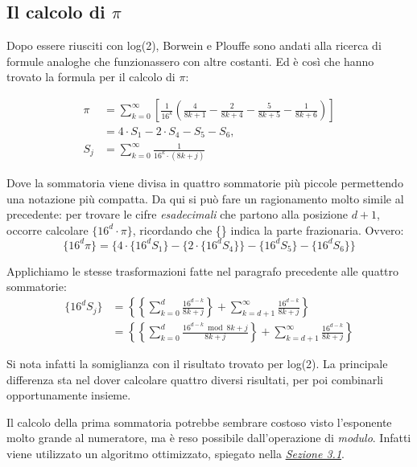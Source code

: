 \subsection{Il calcolo di $\pi$}
Dopo essere riusciti con log(2), Borwein e Plouffe sono andati alla ricerca di formule analoghe che funzionassero con altre costanti. Ed è così che hanno trovato la formula per il calcolo di $\pi$:

\begin{equation*}
\begin{split}
\pi 
& = \sum\limits_{k=0}^{\infty} \left[ \frac{1}{16^k}\left( \frac{4}{8k+1} - \frac{2}{8k+4} - \frac{5}{8k+5} - \frac{1}{8k+6} \right) \right] \\
& =
4 \cdot S_1 - 2 \cdot S_4 - S_5 - S_6, \\
S_j & = \sum\limits_{k=0}^{\infty} \frac{1}{16^k \cdot (8k+j)}
\end{split}
\end{equation*}

Dove la sommatoria viene divisa in quattro sommatorie più piccole permettendo una notazione più compatta.
\bigbreak
Da qui si può fare un ragionamento molto simile al precedente: per trovare le cifre \textit{esadecimali} che partono alla posizione $d+1$, occorre calcolare $\{16^d \cdot \pi\}$, ricordando che \{\} indica la parte frazionaria. Ovvero:
\begin{equation*}
\{16^d\pi\} =
\{4 \cdot \{16^dS_1\} - \{2 \cdot \{16^dS_4\}\} - \{16^dS_5\} - \{16^dS_6\}\}
\end{equation*}

Applichiamo le stesse trasformazioni fatte nel paragrafo precedente alle quattro sommatorie:
\begin{equation*}
\begin{split}
\{16^dS_j\} & = \left\{\left\{\sum\limits_{k=0}^d \frac{16^{d-k}}{8k+j}\right\} + \sum\limits_{k=d+1}^\infty \frac{16^{d-k}}{8k+j}\right\} \\
& = \left\{\left\{\sum\limits_{k=0}^d \frac{16^{d-k}\bmod{8k+j}}{8k+j}\right\} + \sum\limits_{k=d+1}^\infty \frac{16^{d-k}}{8k+j}\right\}
\end{split}
\end{equation*}

Si nota infatti la somiglianza con il risultato trovato per log(2). La principale differenza sta nel dover calcolare quattro diversi risultati, per poi combinarli opportunamente insieme.

Il calcolo della prima sommatoria potrebbe sembrare costoso visto l'esponente molto grande al numeratore, ma è reso possibile dall'operazione di \textit{modulo}. Infatti viene utilizzato un algoritmo ottimizzato, spiegato nella \hyperref[sec:impl_pot]{\textit{Sezione 3.1}}.